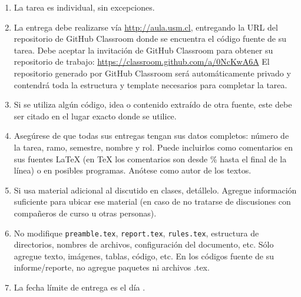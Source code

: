 \begin{enumerate}[(1)]
  \item La tarea es individual, sin excepciones.

  \item La entrega debe realizarse vía \url{http://aula.usm.cl}, entregando la URL del repositorio de GitHub Classroom donde se encuentra el código fuente de su tarea.  
  Debe aceptar la invitación de GitHub Classroom para obtener su repositorio de trabajo:  
  \url{https://classroom.github.com/a/0NcKwA6A}  
  El repositorio generado por GitHub Classroom será automáticamente privado y contendrá toda la estructura y template necesarios para completar la tarea.

  \item Si se utiliza algún código, idea o contenido extraído de otra fuente, este debe ser citado en el lugar exacto donde se utilice.

  \item Asegúrese de que todas sus entregas tengan sus datos completos: número de la tarea, ramo, semestre, nombre y rol. Puede incluirlos como comentarios en sus fuentes \LaTeX{} (en \TeX{} los comentarios son desde \% hasta el final de la línea) o en posibles programas. Anótese como autor de los textos.

  \item Si usa material adicional al discutido en clases, detállelo. Agregue información suficiente para ubicar ese material (en caso de no tratarse de discusiones con compañeros de curso u otras personas).

  \item No modifique \texttt{preamble.tex}, \texttt{report.tex}, \texttt{rules.tex}, estructura de directorios, nombres de archivos, configuración del documento, etc. Sólo agregue texto, imágenes, tablas, código, etc. En los códigos fuente de su informe/reporte, no agregue paquetes ni archivos .tex.

  \item La fecha límite de entrega es el día \tcm{\deadline}.
\end{enumerate}
